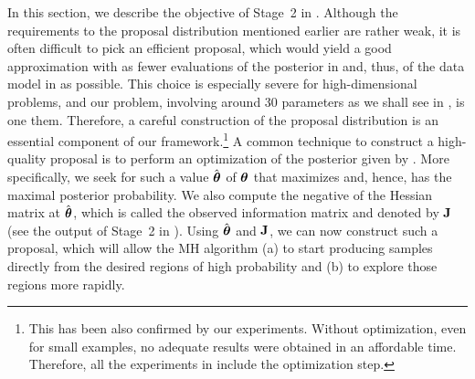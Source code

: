 In this section, we describe the objective of Stage~2 in .
Although the requirements to the proposal distribution mentioned earlier are rather weak, it is often difficult to pick an efficient proposal, which would yield a good approximation with as fewer evaluations of the posterior in  and, thus, of the data model in  as possible.
This choice is especially severe for high-dimensional problems, and our problem, involving around 30 parameters as we shall see in , is one them.
Therefore, a careful construction of the proposal distribution is an essential component of our framework.\footnote{This has been also confirmed by our experiments. Without optimization, even for small examples, no adequate results were obtained in an affordable time. Therefore, all the experiments in  include the optimization step.}
A common technique to construct a high-quality proposal is to perform an optimization of the posterior given by .
More specifically, we seek for such a value $\hat{{\boldsymbol\theta}}$ of ${\boldsymbol\theta}$ that maximizes  and, hence, has the maximal posterior probability.
We also compute the negative of the Hessian matrix at $\hat{{\boldsymbol\theta}}$, which is called the observed information matrix and denoted by $\mathbf{J}$ (see the output of Stage~2 in ).
Using $\hat{{\boldsymbol\theta}}$ and $\mathbf{J}$, we can now construct such a proposal, which will allow the MH algorithm (a) to start producing samples directly from the desired regions of high probability and (b) to explore those regions more rapidly.
